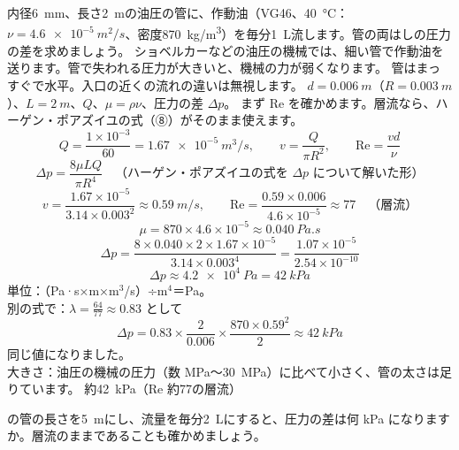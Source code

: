 \begin{phreidai}[油圧の細い管の圧力損失]\label{ph:力-14:ex3}
内径\qty{6}{mm}、長さ\qty{2}{m}の油圧の管に、作動油（VG46、\qty{40}{\celsius}：$\nu=\qty{4.6e-5}{m^2/s}$、密度\qty{870}{kg/m^3}）を毎分\qty{1}{L}流します。管の両はしの圧力の差を求めましょう。
\phbamen
ショベルカーなどの油圧の機械では、細い管で作動油を送ります。管で失われる圧力が大きいと、機械の力が弱くなります。
\phmushi
管はまっすぐで水平。入口の近くの流れの違いは無視します。
\phzu
$d=\qty{0.006}{m}$（$R=\qty{0.003}{m}$）、$L=\qty{2}{m}$、$Q$、$\mu=\rho\nu$、圧力の差 $\Delta p$。
\phriyu
まず Re を確かめます。層流なら、ハーゲン・ポアズイユの式（⑧）がそのまま使えます。
\phtateru
\[Q=\frac{1\times10^{-3}}{60}=\qty{1.67e-5}{m^3/s},\qquad v=\frac{Q}{\pi R^2},\qquad\mathrm{Re}=\frac{vd}{\nu}\]
\[\Delta p=\frac{8\mu LQ}{\pi R^4}\quad\text{（ハーゲン・ポアズイユの式を }\Delta p\text{ について解いた形）}\]
\phtoku
\[v=\frac{1.67\times10^{-5}}{3.14\times0.003^2}\approx\qty{0.59}{m/s},\qquad\mathrm{Re}=\frac{0.59\times0.006}{4.6\times10^{-5}}\approx77\quad\text{（層流）}\]
\[\mu=870\times4.6\times10^{-5}\approx\qty{0.040}{Pa.s}\]
\[\Delta p=\frac{8\times0.040\times2\times1.67\times10^{-5}}{3.14\times0.003^4}=\frac{1.07\times10^{-5}}{2.54\times10^{-10}}\]
\[\Delta p\approx\qty{4.2e4}{Pa}=\qty{42}{kPa}\]
\phtashikame
単位：（Pa·s×m×m$^3$/s）÷m$^4$＝Pa。\\
別の式で：$\lambda=\tfrac{64}{77}\approx0.83$ として
\[\Delta p=0.83\times\frac{2}{0.006}\times\frac{870\times0.59^2}{2}\approx\qty{42}{kPa}\]
同じ値になりました。\\
大きさ：油圧の機械の圧力（数 MPa〜\qty{30}{MPa}）に比べて小さく、管の太さは足りています。
\kotae 約\qty{42}{kPa}（Re 約77の層流）
\end{phreidai}
\begin{jibun}
の管の長さを\qty{5}{m}にし、流量を毎分\qty{2}{L}にすると、圧力の差は何 kPa になりますか。層流のままであることも確かめましょう。
\end{jibun}

